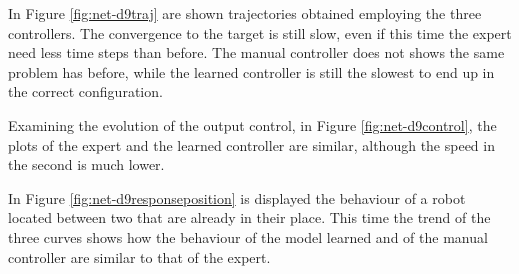 In Figure \ref{fig:net-d9traj} are shown trajectories obtained employing the three 
controllers. The convergence to the target is still slow, even if this time the expert 
need less time steps than before. 
The manual controller does not shows the same problem has before, while the 
learned controller is still the slowest to end up in the correct configuration.

Examining the evolution of the output control, in Figure \ref{fig:net-d9control}, 
the plots of the expert and the learned controller are similar, although the speed 
in the second is much lower.

In Figure \ref{fig:net-d9responseposition} is displayed the behaviour of a robot 
located between two that are already in their place.
This time the trend of the three curves shows how the behaviour of the model 
learned and of the manual controller are similar to that of the expert.

